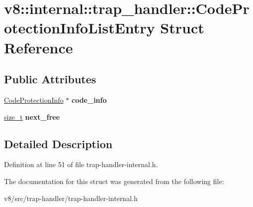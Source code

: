 \hypertarget{structv8_1_1internal_1_1trap__handler_1_1CodeProtectionInfoListEntry}{}\section{v8\+:\+:internal\+:\+:trap\+\_\+handler\+:\+:Code\+Protection\+Info\+List\+Entry Struct Reference}
\label{structv8_1_1internal_1_1trap__handler_1_1CodeProtectionInfoListEntry}
\subsection*{Public Attributes}
\begin{DoxyCompactItemize}
\item 
\mbox{\label{structv8_1_1internal_1_1trap__handler_1_1CodeProtectionInfoListEntry_adba12f3e5653ab085565de39ff7d8d64}} 
\mbox{\hyperlink{structv8_1_1internal_1_1trap__handler_1_1CodeProtectionInfo}{Code\+Protection\+Info}} $\ast$ {\bfseries code\+\_\+info}
\item 
\mbox{\label{structv8_1_1internal_1_1trap__handler_1_1CodeProtectionInfoListEntry_aedeabce121507064fe1812cfd55a9200}} 
\mbox{\hyperlink{classsize__t}{size\+\_\+t}} {\bfseries next\+\_\+free}
\end{DoxyCompactItemize}


\subsection{Detailed Description}


Definition at line 51 of file trap-\/handler-\/internal.\+h.



The documentation for this struct was generated from the following file\+:\begin{DoxyCompactItemize}
\item 
v8/src/trap-\/handler/trap-\/handler-\/internal.\+h\end{DoxyCompactItemize}
